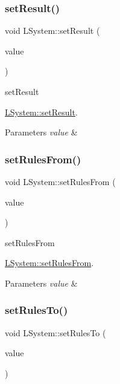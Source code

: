 \subsubsection{\texorpdfstring{set\+Result()}{setResult()}}
{\footnotesize\ttfamily void L\+System\+::set\+Result (\begin{DoxyParamCaption}\item[{const Q\+String \&}]{value }\end{DoxyParamCaption})}



set\+Result 

\hyperlink{classLSystem_a983ac2b4d6becc3a5f8b5ab082b71de1}{L\+System\+::set\+Result}.


\begin{DoxyParams}{Parameters}
{\em value} & \\
\hline
\end{DoxyParams}
\mbox{\label{classLSystem_aa641b21a2548158b5b45b42d2c836b1b}} 
\subsubsection{\texorpdfstring{set\+Rules\+From()}{setRulesFrom()}}
{\footnotesize\ttfamily void L\+System\+::set\+Rules\+From (\begin{DoxyParamCaption}\item[{const Q\+String\+List \&}]{value }\end{DoxyParamCaption})}



set\+Rules\+From 

\hyperlink{classLSystem_aa641b21a2548158b5b45b42d2c836b1b}{L\+System\+::set\+Rules\+From}.


\begin{DoxyParams}{Parameters}
{\em value} & \\
\hline
\end{DoxyParams}
\mbox{\label{classLSystem_a803c72892ac4cb38f080b9a131235d7e}} 
\subsubsection{\texorpdfstring{set\+Rules\+To()}{setRulesTo()}}
{\footnotesize\ttfamily void L\+System\+::set\+Rules\+To (\begin{DoxyParamCaption}\item[{const Q\+String\+List \&}]{value }\end{DoxyParamCaption})}



